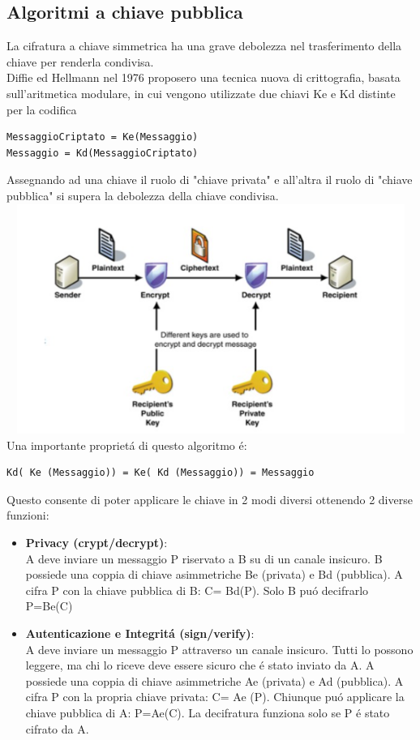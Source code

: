 \documentclass[a4paper, 12 pt, italian]{report}
\begin{document}
\subsection{Algoritmi a chiave pubblica}
La cifratura a chiave simmetrica ha una grave debolezza nel trasferimento della chiave per renderla condivisa.\\
Diffie ed Hellmann nel 1976 proposero una tecnica nuova di crittografia, basata sull'aritmetica modulare, in cui vengono utilizzate due chiavi Ke e Kd distinte per la codifica 
\begin{verbatim}
MessaggioCriptato = Ke(Messaggio)
Messaggio = Kd(MessaggioCriptato)
\end{verbatim}
Assegnando ad una chiave il ruolo di "chiave privata" e all'altra il ruolo di "chiave pubblica" si supera la debolezza della chiave condivisa.\\
\includegraphics[height=75mm, width=150mm]{pubblica}
Una importante propriet\'a di questo algoritmo \'e:
\begin{verbatim}
Kd( Ke (Messaggio)) = Ke( Kd (Messaggio)) = Messaggio
\end{verbatim}
Questo consente di poter applicare le chiave in 2 modi diversi ottenendo 2 diverse funzioni:
\begin{itemize}
\item \textbf{Privacy (crypt/decrypt)}:\\ A deve inviare un messaggio P riservato a B su di un canale insicuro.
B possiede una coppia di chiave asimmetriche Be (privata) e Bd (pubblica).
A cifra P con la chiave pubblica di B: C= Bd(P). Solo B pu\'o decifrarlo P=Be(C)
\item \textbf{Autenticazione e Integrit\'a (sign/verify)}:\\
A deve inviare un messaggio P attraverso un canale insicuro. Tutti lo possono leggere, ma chi lo riceve deve essere sicuro che \'e stato inviato da A.
A possiede una coppia di chiave asimmetriche Ae (privata) e Ad (pubblica).
A cifra P con la propria chiave privata: C= Ae (P). Chiunque pu\'o applicare la chiave pubblica di A: P=Ae(C). La decifratura funziona solo se P \'e stato cifrato da A.
\end{itemize}
\end{document}
